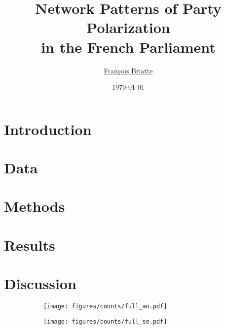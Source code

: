\documentclass[12pt,a4paper]{article}
\title{\large Network Patterns of Party Polarization \\ in the French Parliament}
\author{\href{mailto:f.briatte@ed.ac.uk}{François Briatte}}
\date{\today}
\begin{document}
	\maketitle
  


  \clearpage
  \section{Introduction}\label{sec:intro}%
  

  \section{Data}\label{sec:data}%
  

  \section{Methods}\label{sec:methods}%
  

  \section{Results}\label{sec:results}%
  

  \section{Discussion}\label{sec:discussion}%
  

\theendnotes
\clearpage

\singlespacing

\clearpage
\doublespacing


\begin{figure}[htbp]
  \centering

  \begin{subfigure}[t]{.8\textwidth}
    \texttt{[image: figures/counts/full\_an.pdf]}
    \label{fig:counts_an}
  \end{subfigure}

  \begin{subfigure}[t]{.8\textwidth}
    \texttt{[image: figures/counts/full\_se.pdf]}
    \label{fig:counts_se}
  \end{subfigure}

  \label{fig:counts}
\end{figure}
\end{document}
